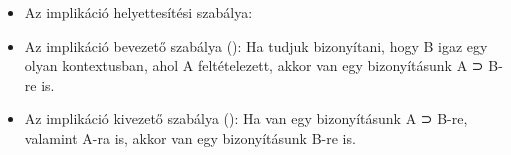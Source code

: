 \begin{itemize}
\item Az implikáció helyettesítési szabálya:
\begin{code}%
%
\>[6]%
\>[12]\AgdaSymbol{:}\AgdaSpace{}%
\AgdaSpace{}%
\AgdaSpace{}%
\AgdaSpace{}%
\AgdaSymbol{\}\{}\AgdaSpace{}%
\AgdaSymbol{:}\AgdaSpace{}%
\AgdaSpace{}%
\AgdaSpace{}%
\AgdaSymbol{\}}\AgdaSpace{}%
\AgdaSpace{}%
\AgdaSymbol{(}\AgdaSpace{}%
\AgdaSpace{}%
\AgdaSymbol{)}\AgdaSpace{}%
\AgdaOperator{\AgdaField{[}}\AgdaSpace{}%
\AgdaSpace{}%
\AgdaOperator{\AgdaField{]ᶠ}}\AgdaSpace{}%
\AgdaSpace{}%
\AgdaSpace{}%
\AgdaOperator{\AgdaField{[}}\AgdaSpace{}%
\AgdaSpace{}%
\AgdaOperator{\AgdaField{]ᶠ}}\AgdaSpace{}%
\AgdaSpace{}%
\AgdaSpace{}%
\AgdaOperator{\AgdaField{[}}\AgdaSpace{}%
\AgdaSpace{}%
\AgdaOperator{\AgdaField{]ᶠ}}\<%
\end{code}
\item Az implikáció bevezető szabálya (): Ha tudjuk bizonyítani, hogy B igaz egy olyan kontextusban, ahol A feltételezett, akkor van egy bizonyításunk A ⊃ B-re is.
\begin{code}%
%
\>[6]%
\>[12]\AgdaSymbol{:}\AgdaSpace{}%
\AgdaSpace{}%
\AgdaSpace{}%
\AgdaSymbol{\}}\AgdaSpace{}%
\AgdaSpace{}%
\AgdaSpace{}%
\AgdaSymbol{(}\AgdaSpace{}%
\AgdaSpace{}%
\AgdaSymbol{)}\AgdaSpace{}%
\AgdaSymbol{(}\AgdaSpace{}%
\AgdaOperator{\AgdaField{[}}\AgdaSpace{}%
\AgdaSpace{}%
\AgdaOperator{\AgdaField{]ᶠ}}\AgdaSymbol{)}\AgdaSpace{}%
\AgdaSpace{}%
\AgdaSpace{}%
\AgdaSpace{}%
\AgdaSymbol{((}\AgdaSpace{}%
\AgdaSpace{}%
\AgdaSymbol{))}\<%
\end{code}
\item Az implikáció kivezető szabálya (): Ha van egy bizonyításunk A ⊃ B-re, valamint A-ra is, akkor van egy bizonyításunk B-re is.
\begin{code}%
%
\>[6]%
\>[12]\AgdaSymbol{:}\AgdaSpace{}%
\AgdaSpace{}%
\AgdaSpace{}%
\AgdaSymbol{\}}\AgdaSpace{}%
\AgdaSpace{}%
\AgdaSpace{}%
\AgdaSpace{}%
\AgdaSymbol{(}\AgdaSpace{}%
\AgdaSpace{}%
\AgdaSymbol{)}\AgdaSpace{}%
\AgdaSpace{}%
\AgdaSpace{}%
\AgdaSpace{}%
\AgdaSpace{}%
\AgdaSpace{}%
\AgdaSpace{}%
\AgdaSpace{}%
\<%
\end{code}
\end{itemize}

